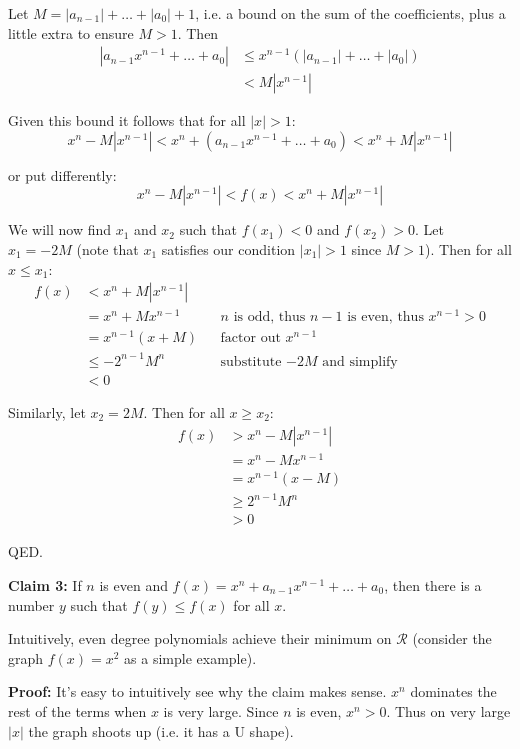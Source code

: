 Let $M=|a_{n-1}|+\ldots+|a_0|+1$, i.e. a bound on the sum of the
coefficients, plus a little extra to ensure $M>1$. Then
\begin{align*}
  |a_{n-1}x^{n-1}+\ldots+a_{0}| &\leq x^{n-1}(|a_{n-1}|+\ldots+|a_0|)\\
                           &< M|x^{n-1}|
\end{align*}

Given this bound it follows that for all $|x|>1$:
\[x^{n}-M|x^{n-1}|<x^{n}+(a_{n-1}x^{n-1}+\ldots+a_{0})<x^{n}+M|x^{n-1}|\]

or put differently:
\[x^{n}-M|x^{n-1}|<f(x)<x^{n}+M|x^{n-1}|\]

We will now find $x_1$ and $x_2$ such that $f(x_1)<0$ and $f(x_2)>0$.
Let $x_1=-2M$ (note that $x_1$ satisfies our condition $|x_1|>1$ since
$M>1$). Then for all $x\leq x_1$:
\begin{align*}
  f(x)&<x^{n}+M|x^{n-1}|\\
      &=x^n+Mx^{n-1}&&n \text{ is odd, thus } n-1\text{ is even, thus } x^{n-1}>0\\
      &=x^{n-1}(x+M)&&\text{factor out } x^{n-1}\\
      &\leq -2^{n-1}M^n&&\text{substitute $-2M$ and simplify}\\
      &<0
\end{align*}

Similarly, let $x_2=2M$. Then for all $x\geq x_2$:
\begin{align*}
  f(x)&>x^{n}-M|x^{n-1}|\\
      &=x^n-Mx^{n-1}\\
      &=x^{n-1}(x-M)\\
      &\geq 2^{n-1}M^n\\
      &>0
\end{align*}

QED.

\vs

\textbf{Claim 3:} If $n$ is even and
$f(x)=x^{n}+a_{n-1}x^{n-1}+\ldots+a_{0}$, then there is a number $y$ such
that $f(y)\leq f(x)$ for all $x$.

\vs

Intuitively, even degree polynomials achieve their minimum on $\mathcal{R}$
(consider the graph $f(x)=x^2$ as a simple example).

\vs

\textbf{Proof:} It's easy to intuitively see why the claim makes
sense. $x^n$ dominates the rest of the terms when $x$ is very large.
Since $n$ is even, $x^n>0$. Thus on very large $|x|$ the graph shoots
up (i.e. it has a U shape).

